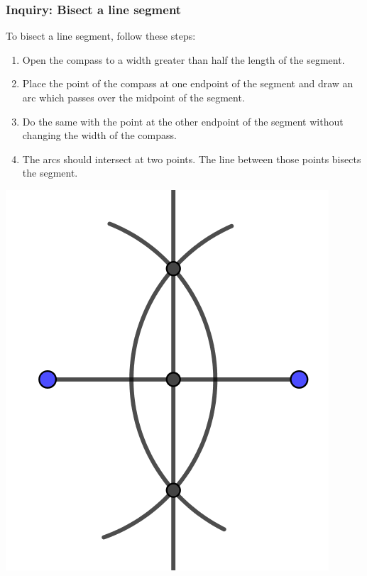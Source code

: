 \documentclass[11pt]{article}
\newenvironment{task}
	{\begin{mdframed}[linecolor=lightgray, linewidth=3pt]\raggedright}
	{\end{mdframed}}
\theoremstyle{definition}
\begin{document}
\subsubsection{Inquiry: Bisect a line segment}
\begin{task}
  To bisect a line segment, follow these steps:
  \begin{enumerate}
    \item Open the compass to a width greater than half the length of the segment.
    \item Place the point of the compass at one endpoint of the segment and draw an arc which passes over the midpoint of the segment.
    \item Do the same with the point at the other endpoint of the segment without changing the width of the compass.
    \item The arcs should intersect at two points. The line between those points bisects the segment. 
  \end{enumerate}
  \begin{center}
    \includegraphics[scale=.75]{Images/bisect_segment.png}
  \end{center}
\end{task}\newpage
\end{document}
